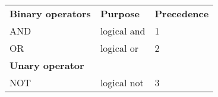 \begin{table}[!h]
  \begin{tabular}[!h]{l l l}
    \toprule
    \textbf{Binary operators} & \textbf{Purpose} & \textbf{Precedence} \\
    AND & logical and & 1 \\
    OR & logical or & 2 \\ \midrule
    \textbf{Unary operator} \\
    NOT & logical not & 3 \\ \bottomrule
  \end{tabular}
\end{table}

